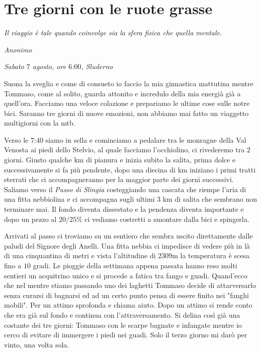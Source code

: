 \clearpage
{}
\chapter{Tre giorni con le ruote grasse}

\begin{flushright}
    \emph{Il viaggio è tale quando coinvolge sia la sfera fisica che quella mentale.}

    \emph{Anonimo}
\end{flushright}

\emph{Sabato $7$ agosto, ore $6$:$00$, Sluderno}  
\vspace{2mm}

Suona la sveglia e come di consueto io faccio la mia ginnastica mattutina mentre Tommaso, come al solito, guarda attonito e incredulo della mia energià già a quell'ora.
Facciamo una veloce colazione e prepariamo le ultime cose sulle notre bici.
Saranno tre giorni di nuove emozioni, non abbiamo mai fatto un viaggetto multigiorni con la mtb.

Verso le $7$:$40$ siamo in sella e cominciamo a pedalare tra le monragne della Val Venosta ai piedi dello Stelvio, al quale facciamo l'occhiolino, ci rivederemo tra $2$ giorni.
Giusto qualche km di pianura e inizia subito la salita, prima dolce e successivamente si fa più pendente, dopo una diecina di km iniziano i primi tratti sterrati che ci accompagneranno per la maggior parte dei giorni successivi.
Saliamo verso il \emph{Passo di Slingia} costeggiando una cascata che riempe l'aria di una fitta nebbiolina e ci accompagna sugli ultimi 3 km di salita che sembrano non terminare mai.
Il fondo diventa dissestato e la pendenza diventa importante e dopo un pezzo al $20/25\%$ ci vediamo costretti a smontare dalla bici e spingerla.

Arrivati al passo ci troviamo su un sentiero che sembra uscito direttamente dalle paludi del Signore degli Anelli.
Una fitta nebbia ci impedisce di vedere più in là di una cinquantina di metri e vista l'altitudine di $2309$m la temperatura è scesa fino a $10$ gradi.
Le pioggie della settimana appena passata hanno reso molti sentieri un acquitrino unico e si procede a fatica tra fango e guadi.
Quand'ecco che nel mentre stiamo passando uno dei laghetti Tommaso decide di attarversarlo senza curarsi di bagnarsi ed ad un certo punto pensa di essere finito nei "fanghi mobili".
Per un attimo sprofonda e chiama aiuto.
Dopo un attimo si rende conto che era già sul fondo e continua con l'attraversamento. Si delina così già una costante dei tre giorni: Tommaso con le scarpe bagnate e infangate mentre io cerco di evitare di immergere i piedi nei guadi.
Solo il terzo giorno mi darò per vinto, una volta sola.

